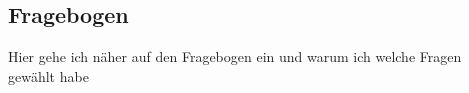 \subsection{Fragebogen} 
Hier gehe ich näher auf den Fragebogen ein und warum ich welche Fragen gewählt habe